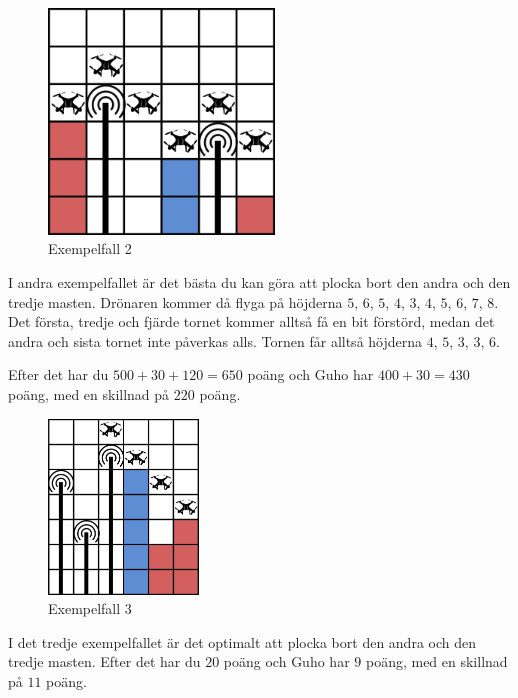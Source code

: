 \begin{figure}[!h]
  \centering
  \includegraphics[width=6cm]{sample1.png}
  \caption{Exempelfall 2}
\end{figure}
I andra exempelfallet är det bästa du kan göra att plocka bort den andra och den tredje masten.
Drönaren kommer då flyga på höjderna $5$, $6$, $5$, $4$, $3$, $4$, $5$, $6$, $7$, $8$.
Det första, tredje och fjärde tornet kommer alltså få en bit förstörd, medan det andra och sista tornet inte påverkas alls.
Tornen får alltså höjderna $4$, $5$, $3$, $3$, $6$.

Efter det har du $500+30+120=650$ poäng och Guho har $400+30=430$ poäng, med en skillnad på $220$ poäng.

\begin{figure}[!h]
  \centering
  \includegraphics[width=4cm]{sample3.png}
  \caption{Exempelfall 3}
\end{figure}
I det tredje exempelfallet är det optimalt att plocka bort den andra och den tredje masten.
Efter det har du $20$ poäng och Guho har $9$ poäng, med en skillnad på $11$ poäng.

